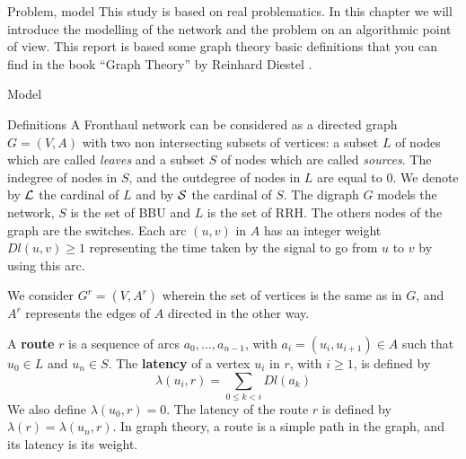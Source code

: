 \documentclass[a4paper,10pt]{report}
\begin{document}
\begin{chapter}{Problem, model}
This study is based on real problematics. In this chapter we will introduce the modelling 
of the network and the problem on an algorithmic point of view. This report is based some graph theory basic definitions that you can find in the book ``Graph Theory'' by Reinhard Diestel \cite{diestel2005graph}.
 \begin{section}{Model}
 \begin{subsection}{Definitions}
  A Fronthaul network can be considered as a directed graph $G=(V,A)$ with two non intersecting subsets of vertices: 
  a subset $L$ of nodes which are called  \emph{leaves} and a subset $S$ of nodes which are called \emph{sources}.  
The indegree of nodes in $S$, and the outdegree of nodes in $L$ are equal to 0. 
We denote by ${\cal L}$ the cardinal of $L$ and by ${\cal S}$ the cardinal of $S$. The digraph $G$ models the network,
$S$ is the set of BBU and $L$ is the set of RRH. The others nodes of the graph are the switches.
Each arc  $(u,v)$ in $A$ has an integer weight $Dl(u,v) \geq 1$ representing the time taken by the signal to go from $u$ to $v$
by using this arc.

We consider $G^r=(V,A^r)$ wherein the set of vertices is the same as in $G$, and $A^r$ represents the edges of $A$ directed in the other way. 
\newline
\begin{center}
\end{center}

A {\bf route} $r$ is a sequence of arcs $a_0, \ldots , a_{n-1}$, with $a_i=(u_i,u_{i+1}) \in A$ such that $u_0 \in L$ and $u_n \in S$.
The {\bf latency} of a vertex $u_i$ in $r$, with $i \geq 1$, is defined by $$\lambda(u_i,r)= \sum\limits_{0 \leq k <i} Dl(a_k)$$ We also define $\lambda(u_0,r)=0$.
The latency of the route $r$ is defined by $\lambda (r)= \lambda (u_n,r)$. In graph theory, a route is a simple path in the graph, and its latency is its weight. 



\end{subsection}
\end{section}
\end{chapter}
\end{document}
